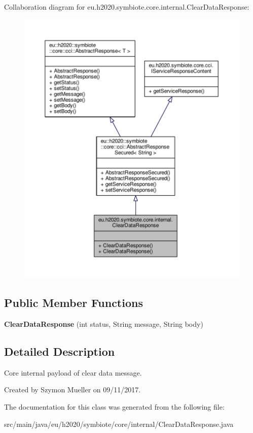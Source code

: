 Collaboration diagram for eu.\+h2020.\+symbiote.\+core.\+internal.\+Clear\+Data\+Response\+:
\nopagebreak
\begin{figure}[H]
\begin{center}
\leavevmode
\includegraphics[width=350pt]{classeu_1_1h2020_1_1symbiote_1_1core_1_1internal_1_1ClearDataResponse__coll__graph}
\end{center}
\end{figure}
\subsection*{Public Member Functions}
\begin{DoxyCompactItemize}
\item 
\mbox{\label{classeu_1_1h2020_1_1symbiote_1_1core_1_1internal_1_1ClearDataResponse_a9cf8ed56c820a16ad6b4516d0c1d7035}} 
{\bfseries Clear\+Data\+Response} (int status, String message, String body)
\end{DoxyCompactItemize}


\subsection{Detailed Description}
Core internal payload of clear data message.

Created by Szymon Mueller on 09/11/2017. 

The documentation for this class was generated from the following file\+:\begin{DoxyCompactItemize}
\item 
src/main/java/eu/h2020/symbiote/core/internal/Clear\+Data\+Response.\+java\end{DoxyCompactItemize}

